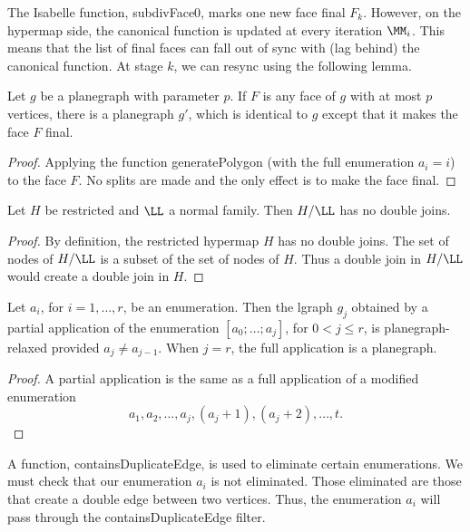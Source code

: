 The Isabelle function, subdivFace0, marks one new face final $F_k$.
However, on the hypermap side, the canonical function is updated at
every iteration $\MM_i$.  This means that the list of final faces can
fall out of sync with (lag behind) the canonical function.  At stage
$k$, we can resync using the following lemma.

\begin{lemma}
  Let $g$ be a planegraph with parameter $p$.  If $F$ is any face of
  $g$ with at most $p$ vertices, there is a planegraph $g'$, which is
  identical to $g$ except that it makes the face $F$ final.
\end{lemma} 

\begin{proof}
  Applying the function generatePolygon (with the full enumeration
  $a_i=i$) to the face $F$.  No splits are made and the only effect is
  to make the face final.
\end{proof}

\begin{lemma} Let $H$ be restricted and $\LL$ a normal family.
Then $H/\LL$ has no double joins.
\end{lemma} 

\begin{proof}
By definition, the restricted hypermap $H$  has no double joins.
The set of nodes of $H/\LL$ is a subset of the set of nodes of $H$.
Thus a double join in $H/\LL$ would create a double join in $H$.
\end{proof}


\begin{lemma}  
Let $a_i$, for $i=1,\ldots,r$, be an enumeration.  
Then the lgraph $g_j$ obtained by a partial application of
the enumeration $[a_0;\ldots;a_j]$, for $0<j\le r$, is 
planegraph-relaxed provided $a_j \ne a_{j-1}$.
When $j=r$, the  full application is a planegraph.
\end{lemma} 

\begin{proof} A partial application is the same as a full application
of a modified enumeration
\[
a_1,a_2,\ldots,a_j,(a_j+1),(a_j+2),\ldots,t.
\]
\end{proof}

\begin{remark}
A function, containsDuplicateEdge, is used to eliminate certain
enumerations.  We must check that our enumeration $a_i$ is not
eliminated.  Those eliminated are those that create a double edge
between two vertices.  Thus, the enumeration $a_i$ will pass through
the containsDuplicateEdge filter.
\end{remark}

